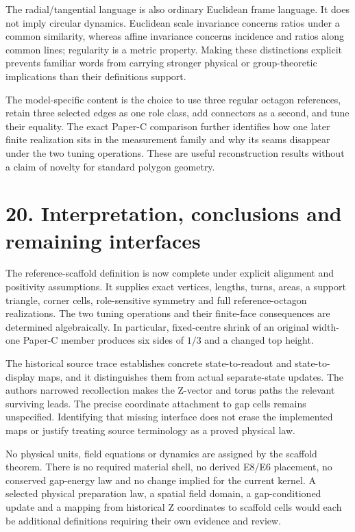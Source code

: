 \documentclass[
  11pt,
  a4paper,
]{article}
\begin{document}
The radial/tangential language is also ordinary Euclidean frame language. It does not imply circular dynamics. Euclidean scale invariance concerns ratios under a common similarity, whereas affine invariance concerns incidence and ratios along common lines; regularity is a metric property. Making these distinctions explicit prevents familiar words from carrying stronger physical or group-theoretic implications than their definitions support.

The model-specific content is the choice to use three regular octagon references, retain three selected edges as one role class, add connectors as a second, and tune their equality. The exact Paper-C comparison further identifies how one later finite realization sits in the measurement family and why its seams disappear under the two tuning operations. These are useful reconstruction results without a claim of novelty for standard polygon geometry.

\section{20. Interpretation, conclusions and remaining interfaces}\label{interpretation-conclusions-and-remaining-interfaces}

The reference-scaffold definition is now complete under explicit alignment and positivity assumptions. It supplies exact vertices, lengths, turns, areas, a support triangle, corner cells, role-sensitive symmetry and full reference-octagon realizations. The two tuning operations and their finite-face consequences are determined algebraically. In particular, fixed-centre shrink of an original width-one Paper-C member produces six sides of \(1/3\) and a changed top height.

The historical source trace establishes concrete state-to-readout and state-to-display maps, and it distinguishes them from actual separate-state updates. The author\textquotesingle s narrowed recollection makes the Z-vector and torus paths the relevant surviving leads. The precise coordinate attachment to gap cells remains unspecified. Identifying that missing interface does not erase the implemented maps or justify treating source terminology as a proved physical law.

No physical units, field equations or dynamics are assigned by the scaffold theorem. There is no required material shell, no derived E8/E6 placement, no conserved gap-energy law and no change implied for the current kernel. A selected physical preparation law, a spatial field domain, a gap-conditioned update and a mapping from historical Z coordinates to scaffold cells would each be additional definitions requiring their own evidence and review.
\end{document}
